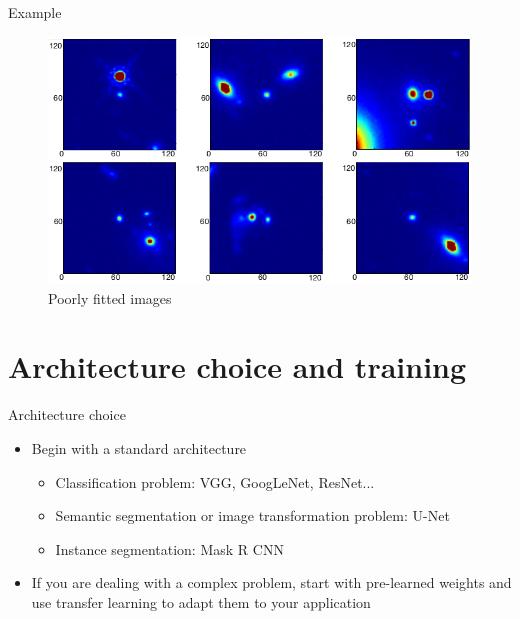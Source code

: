 \documentclass[xcolor=pdftex,dvipsnames,table,mathserif]{beamer}
\begin{document}
\begin{frame}{Example~\tiny\cite{tuccillo_deep_2018}}


    \begin{figure}[ht]
      \centering
      \includegraphics[width=\textwidth]{tuccillo_poorly_fitted}
      Poorly fitted images
    \end{figure}

\end{frame}


\section{Architecture choice and training}

\begin{frame}{Architecture choice}

  \begin{itemize}[<+->]
  \item Begin with a standard architecture
    \begin{itemize}
    \item Classification problem: VGG, GoogLeNet, ResNet...
    \item Semantic segmentation or image transformation problem: U-Net
    \item Instance segmentation: Mask R CNN
    \end{itemize}
  \item If you are dealing with a complex problem, start with pre-learned weights and use transfer learning to adapt them to your application
  \end{itemize}



\end{frame}
\end{document}

